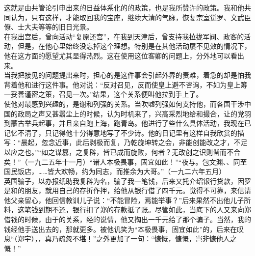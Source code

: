 这就是由共管论引申出来的日益体系化的的政策，也是我所赞许的政策。我和他共同认为，只有这样，才能取回我的宝座，继续大清的气脉，恢复宗室觉罗、文武臣僚、士大夫等等的旧日光景。\\

在我出宫后，曾向活动“复原还宫”，在我到天津后，曾支持我拉拢军阀、政客的活动，但是，在他心里始终没忘掉这个理想。特别是在其他活动屡不见效的情况下，他在这方面的愿望尤其显得热烈。这在使用这位客卿的问题上，分外地可以看出来。\\

当我把接见的问题提出来时，担心的是这件事会引起外界的责难，着急的却是怕我背着他和进行这件事。他对说：“反对召见，反而使皇上避不咨询，不如为皇上筹一妥善谨密之策，召见一次。”结果，这个关系便叫他拉到手上了。\\

使他对最感到兴趣的，是谢和列强的关系。当吹嘘列强如何支持他，而各国干涉中国的政局之声又甚嚣尘上的时候，认为时机来了，兴高采烈地给和撮合，让的党羽到蒙古举兵起事，并且亲自跑上海，跑青岛。他进行了些什么具体活动，我现在已记忆不清了，只记得他十分得意地写了不少诗。他的日记里有这样自我欣赏的描写：“晨起，忽念近事，此后剥极而复，乃乾旋坤转之会，非能创能改之才，不足以应之也。”“如之谋篡，之复辟，皆已成而旋败，何者？无改创之识则凿而不合矣！”（一九二五年十一月）“诸人本极畏事，固宜如此！”“夜与。包文渊、、同至国民饭店，……皆大欢畅，约为同志，而推余为大哥。”（一九二六年五月）\\

英国骗子，以办报纸助我复辟为名，骗了我一笔钱，后来又托介绍银行贷款，因罗是和的朋友，就用自己的存折作押，给他从银行借了四千元。觉得不可靠，来信请他父亲留心，他回信教训儿子说：“不能冒险，焉能举事？”后来果然不出他儿子所料，这笔钱到期不还，银行扣了郑的存款抵了账。尽管如此，当底下的人又来向郑借钱的时候，由于的关系，经的说情，他又掏出一千元给了那个骗子。当然，我的钱经他手送出去的，那就更多。被他讥笑为“本极畏事，固宜如此”的，后来在叹息“（郑宇），，真乃疏忽不堪！”之外更加了一句：“慷慨，慷慨，岂非慷他人之慨！”\\

